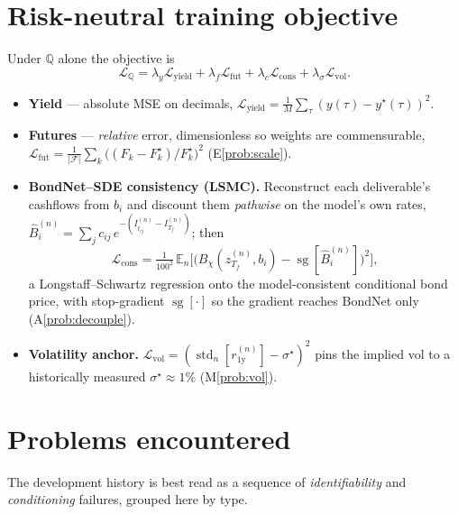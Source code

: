 \documentclass[11pt]{article}
\newcommand{\QQ}{\mathbb{Q}}
\newcommand{\E}{\mathbb{E}}
\newcommand{\sg}{\operatorname{sg}}
\DeclareMathOperator{\std}{std}
\begin{document}
\section{Risk-neutral training objective}\label{sec:obj}
Under $\QQ$ alone the objective is
\begin{equation}
\mathcal L_{\QQ}=
\lambda_y\mathcal L_{\text{yield}}
+\lambda_f\mathcal L_{\text{fut}}
+\lambda_c\mathcal L_{\text{cons}}
+\lambda_\sigma\mathcal L_{\text{vol}} .
\label{eq:objective}
\end{equation}
\begin{itemize}[leftmargin=1.4em]
\item \textbf{Yield} --- absolute MSE on decimals,
$\mathcal L_{\text{yield}}=\frac1M\sum_\tau(y(\tau)-y^\star(\tau))^2$.
\item \textbf{Futures} --- \emph{relative} error, dimensionless so weights are
commensurable, $\mathcal L_{\text{fut}}=\frac1{|\mathcal F|}\sum_k\big((F_k-F^\star_k)/F^\star_k\big)^2$
(E\ref{prob:scale}).
\item \textbf{BondNet--SDE consistency (LSMC).} Reconstruct each deliverable's
cashflows from $b_i$ and discount them \emph{pathwise} on the model's own
rates, $\hat B_i^{(n)}=\sum_j c_{ij}\,e^{-(I^{(n)}_{t_{ij}}-I^{(n)}_{T_f})}$;
then
\begin{equation}
\mathcal L_{\text{cons}}=\tfrac1{100^2}\,\E_n\!\Big[\big(B_\chi(z^{(n)}_{T_f},b_i)-\sg[\hat B_i^{(n)}]\big)^2\Big],
\label{eq:cons}
\end{equation}
a Longstaff--Schwartz regression onto the model-consistent conditional bond
price, with stop-gradient $\sg[\cdot]$ so the gradient reaches BondNet only
(A\ref{prob:decouple}).
\item \textbf{Volatility anchor.}
$\mathcal L_{\text{vol}}=(\std_n[r^{(n)}_{1\mathrm y}]-\sigma^\star)^2$ pins the
implied vol to a historically measured $\sigma^\star\approx1\%$
(M\ref{prob:vol}).
\end{itemize}

\section{Problems encountered}\label{sec:problems}
The development history is best read as a sequence of \emph{identifiability}
and \emph{conditioning} failures, grouped here by type.
\end{document}
